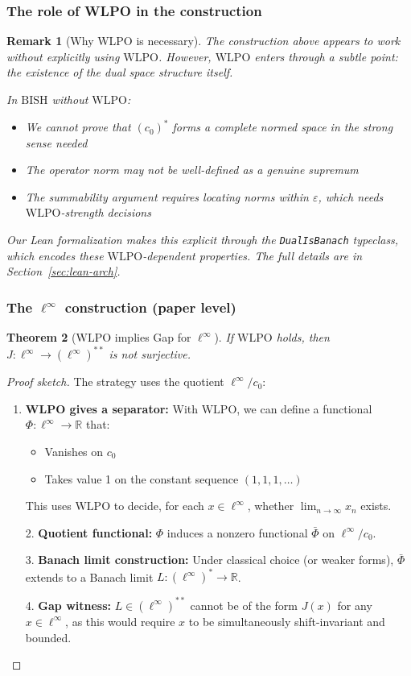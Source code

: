 \documentclass[11pt]{article}  %
\newtheorem{theorem}{Theorem}[section]
\newtheorem{remark}[theorem]{Remark}
\newenvironment{thm}{\begin{theorem}}{\end{theorem}}
\newenvironment{rem}{\begin{remark}}{\end{remark}}
\newcommand{\R}{\mathbb{R}}
\newcommand{\linf}{\ell^\infty}
\newcommand{\WLPO}{\mathrm{WLPO}}
\newcommand{\BISH}{\mathrm{BISH}}
\begin{document}
\subsubsection{The role of WLPO in the construction}

\begin{rem}[Why WLPO is necessary]
The construction above appears to work without explicitly using $\WLPO$. However, $\WLPO$ enters through a subtle point: the existence of the dual space structure itself.

In $\BISH$ without $\WLPO$:
\begin{itemize}
\item We cannot prove that $(c_0)^*$ forms a complete normed space in the strong sense needed
\item The operator norm may not be well-defined as a genuine supremum
\item The summability argument requires locating norms within $\varepsilon$, which needs $\WLPO$-strength decisions
\end{itemize}

Our Lean formalization makes this explicit through the \texttt{DualIsBanach} typeclass, which encodes these $\WLPO$-dependent properties. The full details are in Section~\ref{sec:lean-arch}.
\end{rem}

\subsubsection{The $\ell^\infty$ construction (paper level)}

\begin{thm}[$\WLPO$ implies Gap for $\ell^\infty$]\label{thm:wlpo-gap-linf}
If $\WLPO$ holds, then $J:\linf\to(\linf)^{**}$ is not surjective.
\end{thm}

\begin{proof}[Proof sketch]
The strategy uses the quotient $\linf/c_0$:

\begin{enumerate}
\item \textbf{WLPO gives a separator:} With $\WLPO$, we can define a functional $\Phi:\linf\to\R$ that:
   \begin{itemize}
   \item Vanishes on $c_0$
   \item Takes value 1 on the constant sequence $(1,1,1,\ldots)$
   \end{itemize}
   This uses $\WLPO$ to decide, for each $x\in\linf$, whether $\lim_{n\to\infty} x_n$ exists.

2. \textbf{Quotient functional:} $\Phi$ induces a nonzero functional $\bar{\Phi}$ on $\linf/c_0$.

3. \textbf{Banach limit construction:} Under classical choice (or weaker forms), $\bar{\Phi}$ extends to a Banach limit $L:(\linf)^*\to\R$.

4. \textbf{Gap witness:} $L\in(\linf)^{**}$ cannot be of the form $J(x)$ for any $x\in\linf$, as this would require $x$ to be simultaneously shift-invariant and bounded.
\end{enumerate}
\end{proof}
\end{document}
